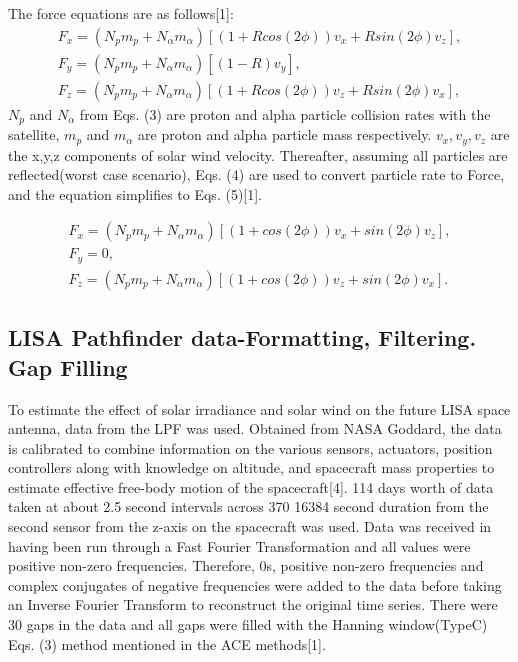 \documentclass[%
 reprint,
 amsmath,amssymb,
 aps,
]{revtex4-2}
\begin{document}
The force equations are as follows[1]:
\begin{equation}\label{eq:Hanning Window}
\begin{split}
F_{x}=(N_{p}m_{p}+N_{\alpha}m_{\alpha})[(1+Rcos(2\phi))v_{x}+Rsin(2\phi)v_{z}], \\ F_{y}=(N_{p}m_{p}+N_{\alpha}m_{\alpha})[(1-R)v_{y}], \\ F_{z}=(N_{p}m_{p}+N_{\alpha}m_{\alpha})[(1+Rcos(2\phi))v_{z}+Rsin(2\phi)v_{x}],
\end{split}
\end{equation}
 \(N_{p}\) and \(N_{\alpha}\) from Eqs. (3) are proton and alpha particle collision rates with the satellite, \(m_{p}\) and \(m_{\alpha}\) are proton and alpha particle mass respectively. \(v_{x},v_{y},v_{z}\) are the x,y,z components of solar wind velocity. Thereafter, assuming all particles are reflected(worst case scenario), Eqs. (4) are used to convert particle rate to Force, and the equation simplifies to Eqs. (5)[1].



\begin{equation}\label{eq:Hanning Window}
\begin{split}
F_{x}=(N_{p}m_{p}+N_{\alpha}m_{\alpha})[(1+cos(2\phi))v_{x}+sin(2\phi)v_{z}], \\ F_{y}=0, \\ F_{z}=(N_{p}m_{p}+N_{\alpha}m_{\alpha})[(1+cos(2\phi))v_{z}+sin(2\phi)v_{x}].
\end{split}
\end{equation}

\subsection{LISA Pathfinder data-Formatting, Filtering. Gap Filling}
To estimate the effect of solar irradiance and solar wind on the future LISA space antenna, data from the LPF was used. Obtained from NASA Goddard, the data is calibrated to combine information on the various sensors, actuators, position controllers along with knowledge on altitude, and spacecraft mass properties to estimate effective free-body motion of the spacecraft[4]. 114 days worth of data taken at about 2.5 second intervals across 370 16384 second duration from the second sensor from the z-axis on the spacecraft was used. Data was received in having been run through a Fast Fourier Transformation and all values were positive non-zero frequencies. Therefore, 0s, positive non-zero frequencies and complex conjugates of negative frequencies were added to the data before taking an Inverse Fourier Transform to reconstruct the original time series. There were 30 gaps in the data and all gaps were filled with the Hanning window(TypeC) Eqs. (3) method mentioned in the ACE methods[1].
\end{document}
